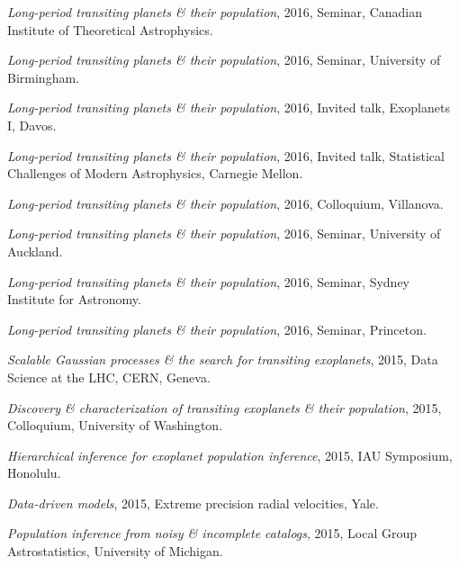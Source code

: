 \documentclass[12pt,letterpaper]{article}
\begin{document}
\begin{list}{}{\cvlist}

\item \emph{Long-period transiting planets \& their population},
    2016, Seminar, Canadian Institute of Theoretical Astrophysics.

\item \emph{Long-period transiting planets \& their population},
    2016, Seminar, University of Birmingham.

\item \emph{Long-period transiting planets \& their population},
    2016, Invited talk, Exoplanets I, Davos.

\item \emph{Long-period transiting planets \& their population},
    2016, Invited talk, Statistical Challenges of Modern Astrophysics,
    Carnegie Mellon.

\item \emph{Long-period transiting planets \& their population}, 2016,
    Colloquium, Villanova.

\item \emph{Long-period transiting planets \& their population},
    2016, Seminar, University of Auckland.

\item \emph{Long-period transiting planets \& their population},
    2016, Seminar, Sydney Institute for Astronomy.

\item \emph{Long-period transiting planets \& their population},
    2016, Seminar, Princeton.

\item \emph{Scalable Gaussian processes \& the search for transiting
    exoplanets}, 2015, Data Science at the LHC, CERN, Geneva.

\item \emph{Discovery \& characterization of transiting exoplanets \& their
    population}, 2015, Colloquium, University of Washington.

\item \emph{Hierarchical inference for exoplanet population inference},
    2015, IAU Symposium, Honolulu.

\item \emph{Data-driven models}, 2015, Extreme precision radial velocities,
    Yale.

\item \emph{Population inference from noisy \& incomplete catalogs}, 2015,
    Local Group Astrostatistics, University of Michigan.


\end{list}
\end{document}
